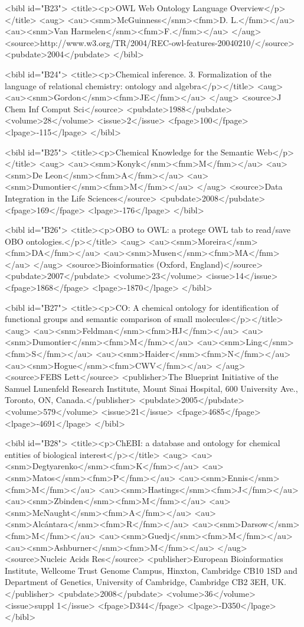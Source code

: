 \documentclass[10pt]{bmc_article}
\newenvironment{bmcformat}{\begin{raggedright}\baselineskip20pt\sloppy\setboolean{publ}{false}}{\end{raggedright}\baselineskip20pt\sloppy}
\begin{document}
\begin{bmcformat}
{<bibl id="B23">
  <title><p>{OWL} Web Ontology Language Overview</p></title>
  <aug>
    <au><snm>McGuinness</snm><fnm>D. L.</fnm></au>
    <au><snm>Van Harmelen</snm><fnm>F.</fnm></au>
  </aug>
  <source>http://www.w3.org/TR/2004/REC-owl-features-20040210/</source>
  <pubdate>2004</pubdate>
</bibl>

<bibl id="B24">
  <title><p>Chemical inference. 3. Formalization of the language of relational
  chemistry: ontology and algebra</p></title>
  <aug>
    <au><snm>Gordon</snm><fnm>JE</fnm></au>
  </aug>
  <source>J Chem Inf Comput Sci</source>
  <pubdate>1988</pubdate>
  <volume>28</volume>
  <issue>2</issue>
  <fpage>100</fpage>
  <lpage>-115</lpage>
</bibl>

<bibl id="B25">
  <title><p>Chemical Knowledge for the Semantic Web</p></title>
  <aug>
    <au><snm>Konyk</snm><fnm>M</fnm></au>
    <au><snm>De Leon</snm><fnm>A</fnm></au>
    <au><snm>Dumontier</snm><fnm>M</fnm></au>
  </aug>
  <source>Data Integration in the Life Sciences</source>
  <pubdate>2008</pubdate>
  <fpage>169</fpage>
  <lpage>-176</lpage>
</bibl>

<bibl id="B26">
  <title><p>{OBO} to {OWL}: a protege {OWL} tab to read/save {OBO}
  ontologies.</p></title>
  <aug>
    <au><snm>Moreira</snm><fnm>DA</fnm></au>
    <au><snm>Musen</snm><fnm>MA</fnm></au>
  </aug>
  <source>Bioinformatics (Oxford, England)</source>
  <pubdate>2007</pubdate>
  <volume>23</volume>
  <issue>14</issue>
  <fpage>1868</fpage>
  <lpage>-1870</lpage>
</bibl>

<bibl id="B27">
  <title><p>{CO}: A chemical ontology for identification of functional groups
  and semantic comparison of small molecules</p></title>
  <aug>
    <au><snm>Feldman</snm><fnm>HJ</fnm></au>
    <au><snm>Dumontier</snm><fnm>M</fnm></au>
    <au><snm>Ling</snm><fnm>S</fnm></au>
    <au><snm>Haider</snm><fnm>N</fnm></au>
    <au><snm>Hogue</snm><fnm>CWV</fnm></au>
  </aug>
  <source>FEBS Lett</source>
  <publisher>The Blueprint Initiative of the Samuel Lunenfeld Research
  Institute, Mount Sinai Hospital, 600 University Ave., Toronto, ON,
  Canada.</publisher>
  <pubdate>2005</pubdate>
  <volume>579</volume>
  <issue>21</issue>
  <fpage>4685</fpage>
  <lpage>-4691</lpage>
</bibl>

<bibl id="B28">
  <title><p>{ChEBI}: a database and ontology for chemical entities of
  biological interest</p></title>
  <aug>
    <au><snm>Degtyarenko</snm><fnm>K</fnm></au>
    <au><snm>Matos</snm><fnm>P</fnm></au>
    <au><snm>Ennis</snm><fnm>M</fnm></au>
    <au><snm>Hastings</snm><fnm>J</fnm></au>
    <au><snm>Zbinden</snm><fnm>M</fnm></au>
    <au><snm>McNaught</snm><fnm>A</fnm></au>
    <au><snm>Alc\'{a}ntara</snm><fnm>R</fnm></au>
    <au><snm>Darsow</snm><fnm>M</fnm></au>
    <au><snm>Guedj</snm><fnm>M</fnm></au>
    <au><snm>Ashburner</snm><fnm>M</fnm></au>
  </aug>
  <source>Nucleic Acids Res</source>
  <publisher>European Bioinformatics Institute, Wellcome Trust Genome Campus,
  Hinxton, Cambridge CB10 1SD and Department of Genetics, University of
  Cambridge, Cambridge CB2 3EH, UK.</publisher>
  <pubdate>2008</pubdate>
  <volume>36</volume>
  <issue>suppl 1</issue>
  <fpage>D344</fpage>
  <lpage>-D350</lpage>
</bibl>

}
\end{bmcformat}
\end{document}
